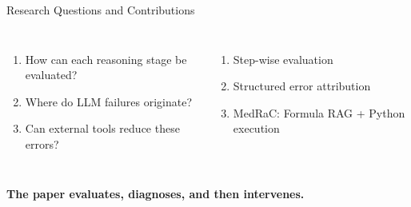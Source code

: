 \begin{frame}{Research Questions and Contributions}
  \vspace{0.22cm}
  \begin{columns}[T,onlytextwidth]
      \par\vspace{0.12cm}
      \begin{enumerate}
        \item How can each reasoning stage be evaluated?
        \item Where do LLM failures originate?
        \item Can external tools reduce these errors?
      \end{enumerate}
      \par\vspace{0.12cm}
      \begin{enumerate}
        \item Step-wise evaluation
        \item Structured error attribution
        \item MedRaC: Formula RAG + Python execution
      \end{enumerate}
  \end{columns}
  \vfill
  \centering
  {\large\bfseries\color{DeepBlue}The paper evaluates, diagnoses, and then intervenes.}
\end{frame}
